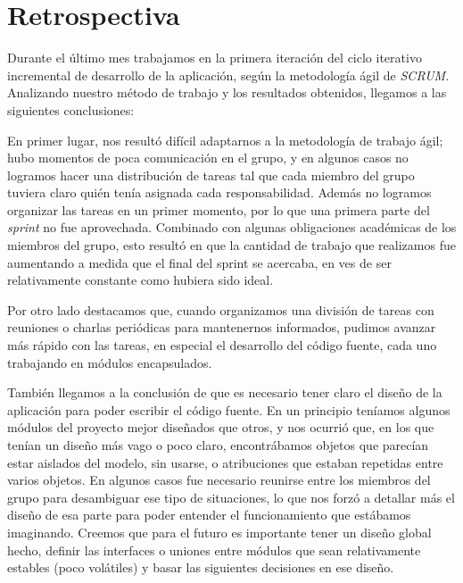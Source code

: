 \section{Retrospectiva} 


Durante el último mes trabajamos en la primera iteración del ciclo iterativo incremental de desarrollo de la aplicación, según la metodología ágil de \emph{SCRUM}. Analizando nuestro método de trabajo y los resultados obtenidos, llegamos a las siguientes conclusiones:

En primer lugar, nos resultó difícil adaptarnos a la metodología de trabajo ágil; hubo momentos de poca comunicación en el grupo, y en algunos casos no logramos hacer una distribución de tareas tal que cada miembro del grupo tuviera claro quién tenía asignada cada responsabilidad. Además no logramos organizar las tareas en un primer momento, por lo que una primera parte del \emph{sprint} no fue aprovechada. Combinado con algunas obligaciones académicas de los miembros del grupo, esto resultó en que la cantidad de trabajo que realizamos fue aumentando a medida que el final del sprint se acercaba, en ves de ser relativamente constante como hubiera sido ideal.

Por otro lado destacamos que, cuando organizamos una división de tareas con reuniones o charlas periódicas para mantenernos informados, pudimos avanzar más rápido con las tareas, en especial el desarrollo del código fuente, cada uno trabajando en módulos encapsulados.

También llegamos a la conclusión de que es necesario tener claro el diseño de la aplicación para poder escribir el código fuente. En un principio teníamos algunos módulos del proyecto mejor diseñados que otros, y nos ocurrió que, en los que tenían un diseño más vago o poco claro, encontrábamos objetos que parecían estar aislados del modelo, sin usarse, o atribuciones que estaban repetidas entre varios objetos. En algunos casos fue necesario reunirse entre los miembros del grupo para desambiguar ese tipo de situaciones, lo que nos forzó a detallar más el diseño de esa parte para poder entender el funcionamiento que estábamos imaginando. Creemos que para el futuro es importante tener un diseño global hecho, definir las interfaces o uniones entre módulos que sean relativamente estables (poco volátiles) y basar las siguientes decisiones en ese diseño.
